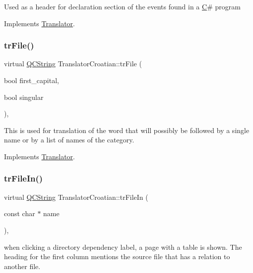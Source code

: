 Used as a header for declaration section of the events found in a \mbox{\hyperlink{class_c}{C}}\# program 

Implements \mbox{\hyperlink{class_translator}{Translator}}.

\mbox{\label{class_translator_croatian_a963510e90a33b2707c9fffc45ff7cc09}} 
\subsubsection{\texorpdfstring{trFile()}{trFile()}}
{\footnotesize\ttfamily virtual \mbox{\hyperlink{class_q_c_string}{Q\+C\+String}} Translator\+Croatian\+::tr\+File (\begin{DoxyParamCaption}\item[{bool}]{first\+\_\+capital,  }\item[{bool}]{singular }\end{DoxyParamCaption})\hspace{0.3cm}{\ttfamily [inline]}, {\ttfamily [virtual]}}

This is used for translation of the word that will possibly be followed by a single name or by a list of names of the category. 

Implements \mbox{\hyperlink{class_translator}{Translator}}.

\mbox{\label{class_translator_croatian_ada21cc324490f28413f2369c2bfe3251}} 
\subsubsection{\texorpdfstring{trFileIn()}{trFileIn()}}
{\footnotesize\ttfamily virtual \mbox{\hyperlink{class_q_c_string}{Q\+C\+String}} Translator\+Croatian\+::tr\+File\+In (\begin{DoxyParamCaption}\item[{const char $\ast$}]{name }\end{DoxyParamCaption})\hspace{0.3cm}{\ttfamily [inline]}, {\ttfamily [virtual]}}

when clicking a directory dependency label, a page with a table is shown. The heading for the first column mentions the source file that has a relation to another file. 

